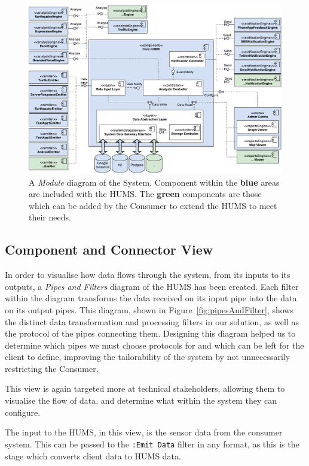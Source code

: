 \documentclass[10pt,a4paper]{article}
\begin{document}
\begin{figure}[ht]
  \centering
  \includegraphics[width=\textwidth]{images/component.pdf}
  \caption{A \emph{Module} diagram of the System. Component within the \textbf{blue} areas are included with the HUMS. The \textbf{green} components are those which can be added by the Consumer to extend the HUMS to meet their needs.}
  \label{fig:modules}
\end{figure}

\subsection{Component and Connector View}
In order to visualise how data flows through the system, from its inputs to its outputs, a \emph{Pipes and Filters} diagram of the HUMS has been created. 
Each filter within the diagram transforms the data received on its input pipe into the data on its output pipes.
This diagram, shown in Figure~\ref{fig:pipesAndFilter}, shows the distinct data transformation and processing filters in our solution, as well as the protocol of the pipes connecting them. Designing this diagram helped us to determine which pipes we must choose protocols for and which can be left for the client to define, improving the tailorability of the system by not unnecessarily restricting the Consumer.

This view is again targeted more at technical stakeholders, allowing them to visualise the flow of data, and determine what within the system they can configure.

The input to the HUMS, in this view, is the sensor data from the consumer system. This can be passed to the \texttt{:Emit Data} filter in any format, as this is the stage which converts client data to HUMS data. 
\end{document}

